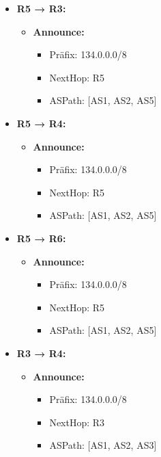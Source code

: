 \documentclass[a4paper]{scrartcl}
\begin{document}
\begin{itemize}
    \item \textbf{R5 → R3:}
    \begin{itemize}
        \item \textbf{Announce:}
        \begin{itemize}
            \item Präfix: 134.0.0.0/8
            \item NextHop: R5
            \item ASPath: [AS1, AS2, AS5]
        \end{itemize}
    \end{itemize}
    \item \textbf{R5 → R4:}
    \begin{itemize}
        \item \textbf{Announce:}
        \begin{itemize}
            \item Präfix: 134.0.0.0/8
            \item NextHop: R5
            \item ASPath: [AS1, AS2, AS5]
        \end{itemize}
    \end{itemize}
    \item \textbf{R5 → R6:}
    \begin{itemize}
        \item \textbf{Announce:}
        \begin{itemize}
            \item Präfix: 134.0.0.0/8
            \item NextHop: R5
            \item ASPath: [AS1, AS2, AS5]
        \end{itemize}
    \end{itemize}
    \item \textbf{R3 → R4:}
    \begin{itemize}
        \item \textbf{Announce:}
        \begin{itemize}
            \item Präfix: 134.0.0.0/8
            \item NextHop: R3
            \item ASPath: [AS1, AS2, AS3]
        \end{itemize}
    \end{itemize}
\end{itemize}
\end{document}
